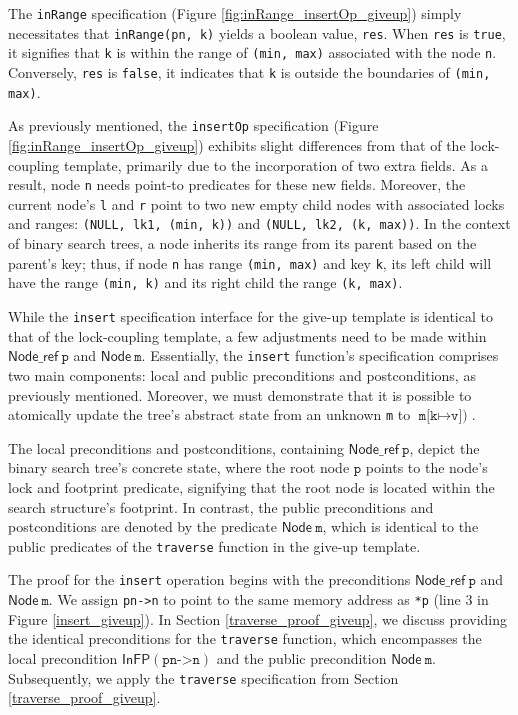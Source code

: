 \documentclass[a4paper,UKenglish,cleveref, autoref, thm-restate]{lipics-v2021}
\newcommand{\treerep}{\ensuremath{\mathsf{Node}}}
\newcommand{\nodeboxrep}{\ensuremath{\mathsf{Node\_ref}}}
\newcommand{\infp}{\ensuremath{\mathsf{InFP}}}
\begin{document}
The \texttt{inRange} specification (Figure \ref{fig:inRange_insertOp_giveup}) simply necessitates that \texttt{inRange(pn, k)}  yields a boolean value, \texttt{res}. When \texttt{res} is \texttt{true}, it signifies that \texttt{k} is within the range of \texttt{(min, max)} associated with the node \texttt{n}. 
Conversely, \texttt{res} is \texttt{false}, it indicates that \texttt{k} is outside the boundaries of \texttt{(min, max)}. 

As previously mentioned, the \texttt{insertOp} specification (Figure \ref{fig:inRange_insertOp_giveup}) exhibits slight differences from that of the lock-coupling template, primarily due to the incorporation of two extra fields. As a result, node \texttt{n} needs point-to predicates for these new fields. Moreover, the current node's \texttt{l} and \texttt{r} point to two new empty child nodes with associated locks and ranges: \texttt{(NULL, lk1, (min, k))} and \texttt{(NULL, lk2, (k, max))}.  In the context of binary search trees, a node inherits its range from its parent based on the parent's key; thus, if node \texttt{n} has range \texttt{(min, max)} and key \texttt{k}, its left child will have the range \texttt{(min, k)} and its right child the range \texttt{(k, max)}. 


While the \texttt{insert} specification interface for the give-up template is identical to that of the lock-coupling template, a few adjustments need to be made within $\nodeboxrep\ \texttt{p}$ and $\treerep \ \texttt{m}$. Essentially, the \texttt{insert} function's specification comprises two main components: local and public preconditions and postconditions, as previously mentioned. Moreover, we must demonstrate that it is possible to atomically update the tree's abstract state from an unknown \texttt{m} to $\texttt{m[k} \mapsto \texttt{v])}$.

The local preconditions and postconditions, containing $\nodeboxrep \ \texttt{p}$, depict the binary search tree's concrete state, where the root node $\texttt{p}$ points to the node's lock and footprint predicate, signifying that the root node is located within the search structure's footprint. In contrast, the public preconditions and postconditions are denoted by the predicate  $\treerep \ \texttt{m}$, which is identical to the public predicates of the \texttt{traverse} function in the give-up template. 

The proof for the \texttt{insert} operation begins with the preconditions $\nodeboxrep \ \texttt{p}$ and $\treerep \ \texttt{m}$. We assign \texttt{pn->n} to point to the same memory address as \texttt{*p} (line 3 in Figure \ref{insert_giveup}). In Section \ref{traverse_proof_giveup}, we discuss providing the identical preconditions for the \texttt{traverse} function, which encompasses the local precondition $\infp(\texttt{pn->n})$ and the public precondition $\treerep\ \texttt{m}$. Subsequently, we apply the \texttt{traverse} specification from Section \ref{traverse_proof_giveup}.
\end{document}
